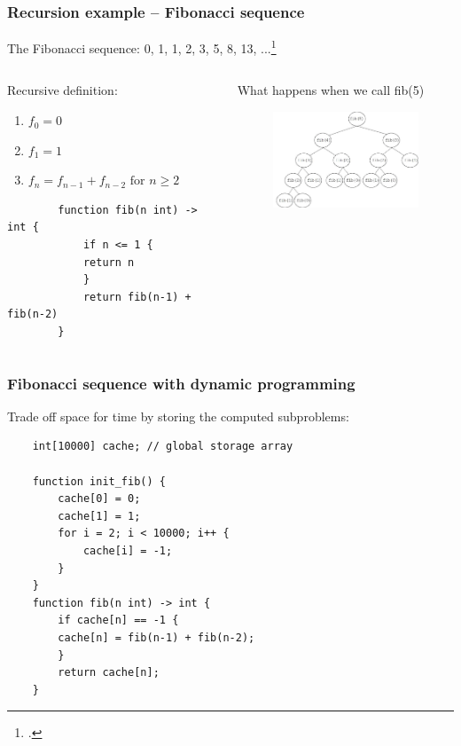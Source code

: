 \documentclass{beamer}
\begin{document}
\begin{frame}[fragile]
	\frametitle{Recursion example -- Fibonacci sequence}
	The Fibonacci sequence: 0, 1, 1, 2, 3, 5, 8, 13, ...\footcite{clrs}
	\vspace{1em}
	\begin{columns}
		\begin{column}{0.45\textwidth}
		Recursive definition:
		\begin{enumerate}
			\item
				$f_{0} = 0$
			\item
				$f_{1} = 1$
			\item
				$f_{n} = f_{n-1} + f_{n-2} \text{ for } n \ge 2$
		\end{enumerate}
		\begin{verbatim}
		function fib(n int) -> int {
		    if n <= 1 {
			return n
		    }
		    return fib(n-1) + fib(n-2)
		}
		\end{verbatim}
		\end{column}
		\begin{column}{0.45\textwidth}
		What happens when we call fib(5)
		\begin{figure}
			\includegraphics[width=5.25cm]{./fibrecurse.jpg}\footnotemark
		\end{figure}
		\end{column}
	\end{columns}
\end{frame}

\begin{frame}[fragile]
	\frametitle{Fibonacci sequence with dynamic programming}
	Trade off space for time by storing the computed subproblems:
	\begin{verbatim}
	int[10000] cache; // global storage array

	function init_fib() {
	    cache[0] = 0;
	    cache[1] = 1;
	    for i = 2; i < 10000; i++ {
	        cache[i] = -1;
	    }
	}
	function fib(n int) -> int {
	    if cache[n] == -1 {
        cache[n] = fib(n-1) + fib(n-2);
	    }
	    return cache[n];
	}
	\end{verbatim}
\end{frame}
\end{document}
